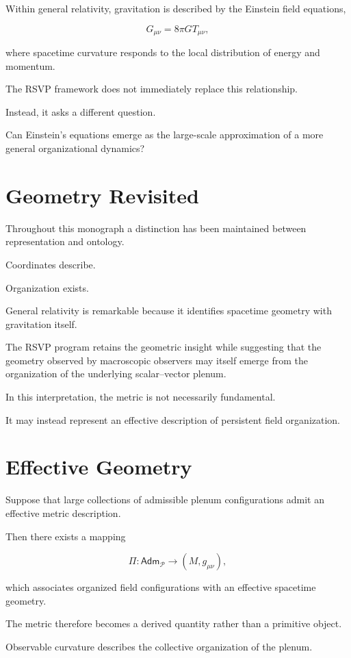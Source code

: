 \documentclass[11pt,oneside]{book}
\numberwithin{equation}{chapter}
\theoremstyle{definition}
\theoremstyle{plain}
\newcommand{\Adm}{\mathsf{Adm}}
\begin{document}
Within general relativity, gravitation is described by the Einstein field
equations,

\[
G_{\mu\nu}
=
8\pi G
T_{\mu\nu},
\]

where spacetime curvature responds to the local distribution of energy and
momentum.

The RSVP framework does not immediately replace this relationship.

Instead, it asks a different question.

Can Einstein's equations emerge as the large-scale approximation of a more
general organizational dynamics?

\section{Geometry Revisited}

Throughout this monograph a distinction has been maintained between
representation and ontology.

Coordinates describe.

Organization exists.

General relativity is remarkable because it identifies spacetime geometry
with gravitation itself.

The RSVP program retains the geometric insight while suggesting that the
geometry observed by macroscopic observers may itself emerge from the
organization of the underlying scalar--vector plenum.

In this interpretation, the metric is not necessarily fundamental.

It may instead represent an effective description of persistent field
organization.

\section{Effective Geometry}

Suppose that large collections of admissible plenum configurations admit an
effective metric description.

Then there exists a mapping

\[
\Pi :
\Adm_{\mathcal P}
\longrightarrow
(M,g_{\mu\nu}),
\]

which associates organized field configurations with an effective spacetime
geometry.

The metric therefore becomes a derived quantity rather than a primitive
object.

Observable curvature describes the collective organization of the plenum.
\end{document}
